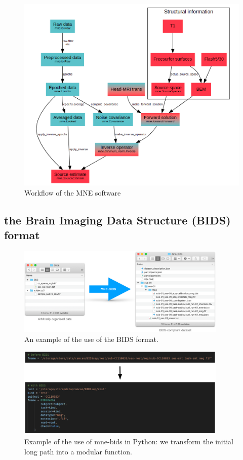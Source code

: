 \begin{figure}[ht]
    \centering
    \includegraphics[width=13cm]{images_report/workflow_of_the_mne_software.png}
    \caption[Workflow of the MNE software]%
    {Workflow of the MNE software \cite{GramfortEtAl2013a}}
    \label{workflow_mne}
\end{figure}


\subsection{the Brain Imaging Data Structure (BIDS) format}

\begin{figure}[ht]
    \centering
    \includegraphics[width=10cm]{images_report/BIDS.png}
    \caption{An example of the use of the BIDS format.}
    \label{BIDS}
\end{figure}

\begin{figure}[ht]
    \centering
    \includegraphics[width=10cm]{images_report/bids_example.png}
    \caption[Example of use of mne-bids]%
    {Example of the use of mne-bids in Python: we transform the initial long path into a modular function.}
    \label{bids_example}
\end{figure}


